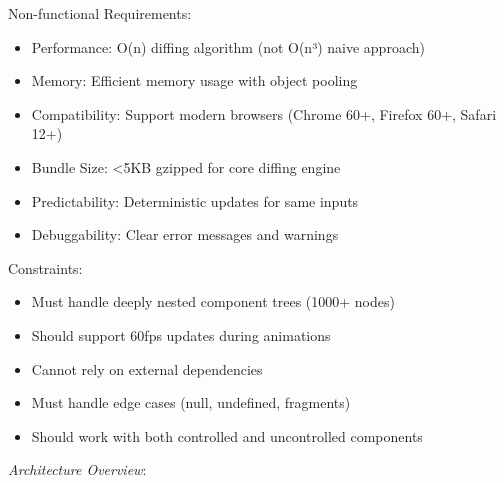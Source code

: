 \documentclass[11pt]{article}
\begin{document}
Non-functional Requirements:

\begin{itemize}
\item Performance: O(n) diffing algorithm (not O(n³) naive approach)
\item Memory: Efficient memory usage with object pooling
\item Compatibility: Support modern browsers (Chrome 60+, Firefox 60+, Safari 12+)
\item Bundle Size: <5KB gzipped for core diffing engine
\item Predictability: Deterministic updates for same inputs
\item Debuggability: Clear error messages and warnings
\end{itemize}

Constraints:

\begin{itemize}
\item Must handle deeply nested component trees (1000+ nodes)
\item Should support 60fps updates during animations
\item Cannot rely on external dependencies
\item Must handle edge cases (null, undefined, fragments)
\item Should work with both controlled and uncontrolled components
\end{itemize}

\emph{Architecture Overview}:
\end{document}
